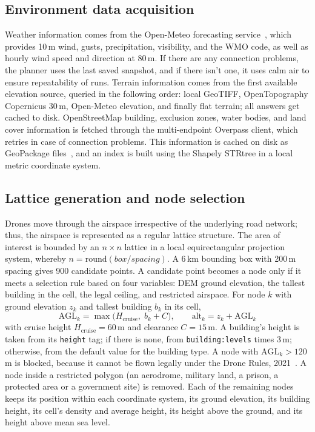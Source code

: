 \subsection{Environment data acquisition}

Weather information comes from the Open-Meteo forecasting service~\cite{r20}, which
provides 10\,m wind, gusts, precipitation, visibility, and the WMO code, as well as
hourly wind speed and direction at 80\,m. If there are any connection problems, the
planner uses the last saved snapshot, and if there isn't one, it uses calm air to ensure
repeatability of runs. Terrain information comes from the first available elevation
source, queried in the following order: local GeoTIFF, OpenTopography Copernicus 30\,m,
Open-Meteo elevation, and finally flat terrain; all answers get cached to disk.
OpenStreetMap building, exclusion zones, water bodies, and land cover information is
fetched through the multi-endpoint Overpass client, which retries in case of connection
problems. This information is cached on disk as GeoPackage files~\cite{r4}, and an index
is built using the Shapely STRtree in a local metric coordinate system.

\subsection{Lattice generation and node selection}

Drones move through the airspace irrespective of the underlying road network; thus, the
airspace is represented as a regular lattice structure. The area of interest is bounded
by an $n \times n$ lattice in a local equirectangular projection system, whereby $n = \mathrm{round}(\mathit{box}/\mathit{spacing})$. A 6\,km bounding box with 200\,m spacing gives 900 candidate points. A candidate point becomes a node only if it meets a selection rule based on four variables: DEM ground elevation, the
tallest building in the cell, the legal ceiling, and restricted airspace. For node $k$ with ground
elevation $z_k$ and tallest building $b_k$ in its cell,
\begin{equation}
  \mathrm{AGL}_k = \max\bigl(H_\mathrm{cruise},\; b_k + C\bigr), \qquad
  \mathrm{alt}_k = z_k + \mathrm{AGL}_k \label{eq:alt}
\end{equation}
with cruise height $H_\mathrm{cruise} = 60$\,m and clearance $C = 15$\,m. A building's height is taken from its \texttt{height} tag; if there is none, from \texttt{building:levels} times 3\,m; otherwise, from the default value for the building type. A node with $\mathrm{AGL}_k > 120$\,m is
blocked, because it cannot be flown legally under the Drone Rules, 2021~\cite{r21}. A
node inside a restricted polygon (an aerodrome, military land, a prison, a protected area
or a government site) is removed. Each of the remaining nodes keeps its position within
each coordinate system, its ground elevation, its building height, its cell's density
and average height, its height above the ground, and its height above mean sea level.

